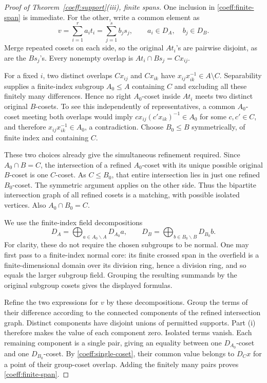 \begin{proof}[Proof of Theorem~\ref{coeff:support}(iii), finite spans]
One inclusion in \eqref{coeff:finite-span} is immediate. For the
other, write a common element as
\[
 v=\sum_{i=1}^{r}a_i t_i=\sum_{j=1}^{s}b_j s_j,
 \qquad a_i\in D_A,\quad b_j\in D_B.
\]
Merge repeated cosets on each side, so the original \(At_i\)'s are
pairwise disjoint, as are the \(Bs_j\)'s. Every nonempty overlap is
\(At_i\cap Bs_j=Cx_{ij}\).

For a fixed \(i\), two distinct overlaps \(Cx_{ij}\) and
\(Cx_{ik}\) have
\(x_{ij}x_{ik}^{-1}\in A\setminus C\). Separability supplies a
finite-index subgroup \(A_0\le A\) containing \(C\) and excluding
all these finitely many differences. Hence no right \(A_0\)-coset
inside \(At_i\) meets two distinct original \(B\)-cosets. To see
this independently of representatives, a common \(A_0\)-coset meeting
both overlaps would imply
\(c x_{ij}(c'x_{ik})^{-1}\in A_0\) for some \(c,c'\in C\), and
therefore \(x_{ij}x_{ik}^{-1}\in A_0\), a contradiction. Choose
\(B_0\le B\) symmetrically, of finite index and containing \(C\).

These two choices already give the simultaneous refinement required.
Since \(A_0\cap B=C\), the intersection of a refined \(A_0\)-coset
with its unique possible original \(B\)-coset is one \(C\)-coset.
As \(C\le B_0\), that entire intersection lies in just one refined
\(B_0\)-coset. The symmetric argument applies on the other side.
Thus the bipartite intersection graph of all refined cosets is a
matching, with possible isolated vertices. Also
\(A_0\cap B_0=C\).

We use the finite-index field decompositions
\[
 D_A=\bigoplus_{a\in A_0\backslash A}D_{A_0}a,
 \qquad
 D_B=\bigoplus_{b\in B_0\backslash B}D_{B_0}b.
\]
For clarity, these do not require the chosen subgroups to be normal.
One may first pass to a finite-index normal core: its finite crossed
span in the overfield is a finite-dimensional domain over its division
ring, hence a division ring, and so equals the larger subgroup field.
Grouping the resulting summands by the original subgroup cosets gives
the displayed formulas.

Refine the two expressions for \(v\) by these decompositions. Group
the terms of their difference according to the connected components
of the refined intersection graph. Distinct components have disjoint
unions of permitted supports. Part (i) therefore makes the value of
each component zero. Isolated terms vanish. Each remaining component
is a single pair, giving an equality between one \(D_{A_0}\)-coset
and one \(D_{B_0}\)-coset. By \eqref{coeff:single-coset}, their common
value belongs to \(D_Cx\) for a point of their group-coset overlap.
Adding the finitely many pairs proves \eqref{coeff:finite-span}.
\end{proof}
